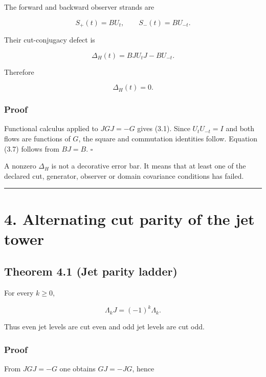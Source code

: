 The forward and backward observer strands are

\[
S_+(t)=BU_t,
\qquad
S_-(t)=BU_{-t}.
\tag{3.5}
\]

Their cut-conjugacy defect is

\[
\Delta_H(t)=BJU_tJ-BU_{-t}.
\tag{3.6}
\]

Therefore

\[
\boxed{\Delta_H(t)=0.}
\tag{3.7}
\]

\hypertarget{proof}{%
\subsubsection{Proof}\label{proof}}

Functional calculus applied to \(JGJ=-G\) gives (3.1). Since \(U_tU_{-t}=I\)
and both flows are functions of \(G\), the square and commutation identities
follow. Equation (3.7) follows from \(BJ=B\). \(\square\)

A nonzero \(\Delta_H\) is not a decorative error bar. It means that at least
one of the declared cut, generator, observer or domain covariance conditions
has failed.

\begin{center}\rule{0.5\linewidth}{0.5pt}\end{center}

\hypertarget{alternating-cut-parity-of-the-jet-tower}{%
\section{4. Alternating cut parity of the jet tower}\label{alternating-cut-parity-of-the-jet-tower}}

\hypertarget{theorem-4.1-jet-parity-ladder}{%
\subsection{Theorem 4.1 (Jet parity ladder)}\label{theorem-4.1-jet-parity-ladder}}

For every \(k\ge0\),

\[
\boxed{\Lambda_kJ=(-1)^k\Lambda_k.}
\tag{4.1}
\]

Thus even jet levels are cut even and odd jet levels are cut odd.

\hypertarget{proof-1}{%
\subsubsection{Proof}\label{proof-1}}

From \(JGJ=-G\) one obtains \(GJ=-JG\), hence

